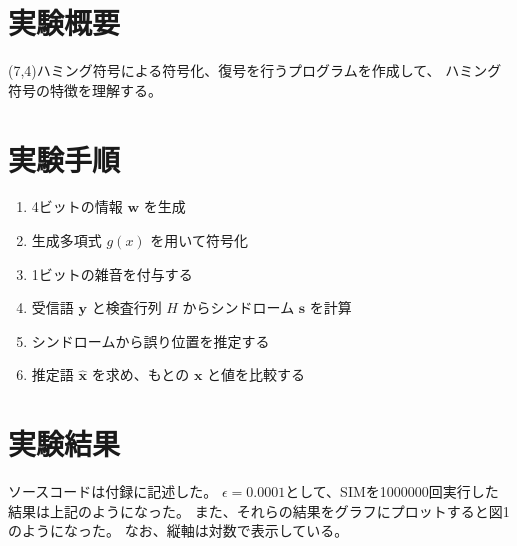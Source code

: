 \documentclass[12pt]{jarticle}
\begin{document}



\section{実験概要}
 (7,4)ハミング符号による符号化、復号を行うプログラムを作成して、
ハミング符号の特徴を理解する。

\section{実験手順}
\begin{enumerate}
    \item 4ビットの情報 $\boldsymbol{w}$ を生成
    \item 生成多項式 $g(x)$ を用いて符号化
    \item 1ビットの雑音を付与する
    \item 受信語 $\boldsymbol{y}$ と検査行列 $H$ からシンドローム $\boldsymbol{s}$ を計算
    \item シンドロームから誤り位置を推定する
    \item 推定語 $\hat{\boldsymbol{x}}$ を求め、もとの $\boldsymbol{x}$ と値を比較する
\end{enumerate}

\section{実験結果}

ソースコードは付録に記述した。
$\epsilon=0.0001$として、SIMを1000000回実行した結果は上記のようになった。
また、それらの結果をグラフにプロットすると図1のようになった。
なお、縦軸は対数で表示している。
\end{document}
